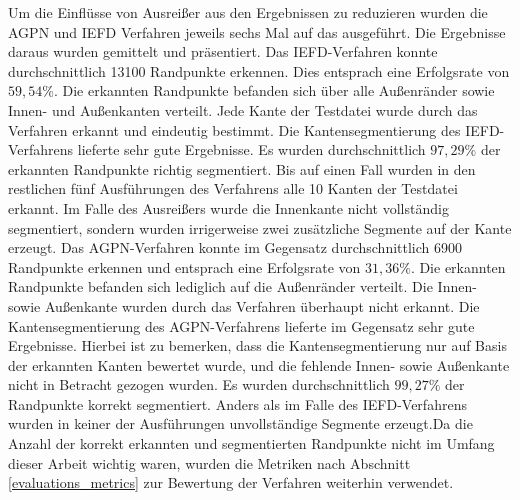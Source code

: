 Um die Einflüsse von Ausreißer aus den Ergebnissen zu reduzieren wurden die AGPN und IEFD Verfahren jeweils sechs Mal auf das \testcloud ausgeführt. Die Ergebnisse daraus wurden gemittelt und präsentiert. Das IEFD-Verfahren konnte durchschnittlich 13100 Randpunkte erkennen. Dies entsprach eine Erfolgsrate von $59,54\%$. Die erkannten Randpunkte befanden sich über alle Außenränder sowie Innen- und Außenkanten verteilt. Jede Kante der Testdatei wurde durch das Verfahren erkannt und eindeutig bestimmt. Die Kantensegmentierung des IEFD-Verfahrens lieferte sehr gute Ergebnisse. Es wurden durchschnittlich $97,29\%$ der erkannten Randpunkte richtig segmentiert. Bis auf einen Fall wurden in den restlichen fünf Ausführungen des Verfahrens alle 10 Kanten der Testdatei erkannt. Im Falle des Ausreißers wurde die Innenkante nicht vollständig segmentiert, sondern wurden irrigerweise zwei zusätzliche Segmente auf der Kante erzeugt. Das AGPN-Verfahren konnte im Gegensatz durchschnittlich 6900 Randpunkte erkennen und entsprach eine Erfolgsrate von $31,36\%$. Die erkannten Randpunkte befanden sich lediglich auf die Außenränder verteilt. Die Innen- sowie Außenkante wurden durch das Verfahren überhaupt nicht erkannt. Die Kantensegmentierung des AGPN-Verfahrens lieferte im Gegensatz sehr gute Ergebnisse. Hierbei ist zu bemerken, dass die Kantensegmentierung nur auf Basis der erkannten Kanten bewertet wurde, und die fehlende Innen- sowie Außenkante nicht in Betracht gezogen wurden. Es wurden durchschnittlich $99,27\%$ der Randpunkte korrekt segmentiert. Anders als im Falle des IEFD-Verfahrens wurden in keiner der Ausführungen unvollständige Segmente erzeugt.Da die Anzahl der korrekt erkannten und segmentierten Randpunkte nicht im Umfang dieser Arbeit wichtig waren, wurden die Metriken nach Abschnitt \ref{evaluations_metrics} zur Bewertung der Verfahren weiterhin verwendet. 


